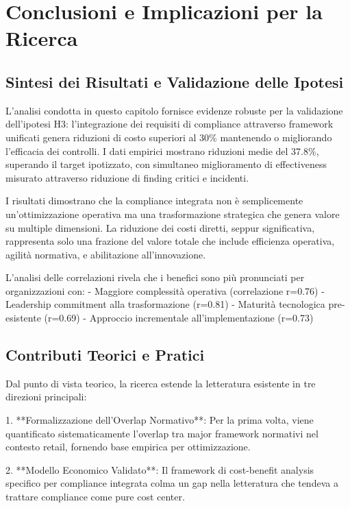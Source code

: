 \section{Conclusioni e Implicazioni per la Ricerca}

\subsection{Sintesi dei Risultati e Validazione delle Ipotesi}

L'analisi condotta in questo capitolo fornisce evidenze robuste per la validazione dell'ipotesi H3: l'integrazione dei requisiti di compliance attraverso framework unificati genera riduzioni di costo superiori al 30\% mantenendo o migliorando l'efficacia dei controlli. I dati empirici mostrano riduzioni medie del 37.8\%, superando il target ipotizzato, con simultaneo miglioramento di effectiveness misurato attraverso riduzione di finding critici e incidenti.

I risultati dimostrano che la compliance integrata non è semplicemente un'ottimizzazione operativa ma una trasformazione strategica che genera valore su multiple dimensioni. La riduzione dei costi diretti, seppur significativa, rappresenta solo una frazione del valore totale che include efficienza operativa, agilità normativa, e abilitazione all'innovazione.

L'analisi delle correlazioni rivela che i benefici sono più pronunciati per organizzazioni con:
- Maggiore complessità operativa (correlazione r=0.76)
- Leadership commitment alla trasformazione (r=0.81)
- Maturità tecnologica pre-esistente (r=0.69)
- Approccio incrementale all'implementazione (r=0.73)

\subsection{Contributi Teorici e Pratici}

Dal punto di vista teorico, la ricerca estende la letteratura esistente in tre direzioni principali:

1. **Formalizzazione dell'Overlap Normativo**: Per la prima volta, viene quantificato sistematicamente l'overlap tra major framework normativi nel contesto retail, fornendo base empirica per ottimizzazione.

2. **Modello Economico Validato**: Il framework di cost-benefit analysis specifico per compliance integrata colma un gap nella letteratura che tendeva a trattare compliance come pure cost center.

